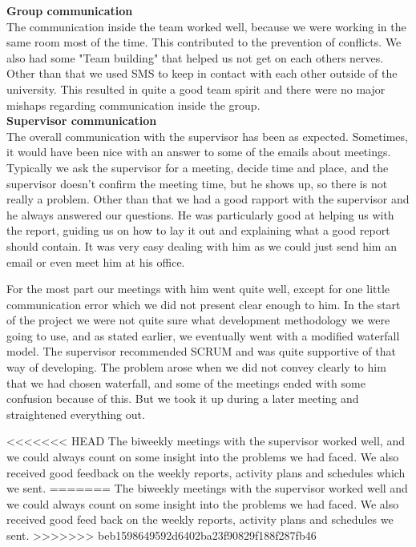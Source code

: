
\indent \indent \textbf{Group communication} \\
The communication inside the team worked well, because we were working in the same room most of the time. This contributed to the prevention of conflicts. We also had some "Team building" that helped us not get on each others nerves. Other than that we used SMS to keep in contact with each other outside of the university. This resulted in quite a good team spirit and there were no major mishaps regarding communication inside the group.
\\

\textbf{Supervisor communication} \\
The overall communication with the supervisor has been as expected. Sometimes, it would have been nice with an answer to some of the emails about meetings. Typically we ask the supervisor for a meeting, decide time and place, and the supervisor doesn't confirm the meeting time, but he shows up, so there is not really a problem. Other than that we had a good rapport with the supervisor and he always answered our questions. He was particularly good at helping us with the report, guiding us on how to lay it out and explaining what a good report should contain. It was very easy dealing with him as we could just send him an email or even meet him at his office.

For the most part our meetings with him went quite well, except for one little communication error which we did not present clear enough to him. In the start of the project we were not quite sure what development methodology we were going to use, and as stated earlier, we eventually went with a modified waterfall model. The supervisor recommended SCRUM and was quite supportive of that way of developing. The problem arose when we did not convey clearly to him that we had chosen waterfall, and some of the meetings ended with some confusion because of this. But we took it up during a later meeting and straightened everything out.

<<<<<<< HEAD
The biweekly meetings with the supervisor worked well, and we could always count on some insight into the problems we had faced. We also received good feedback on the weekly reports, activity plans and schedules which we sent.
=======
The biweekly meetings with the supervisor worked well and we could always count on some insight into the problems we had faced. We also received good feed back on the weekly reports, activity plans and schedules we sent.
>>>>>>> beb1598649592d6402ba23f90829f188f287fb46
\\ 

